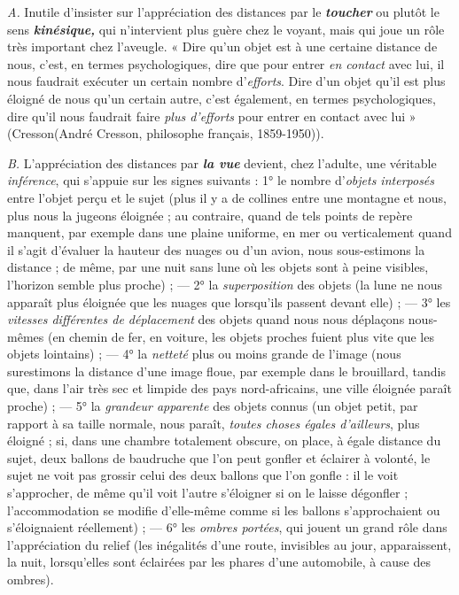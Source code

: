 {\it A.} Inutile d’insister sur l'appréciation des distances par le \textbf{\textit {toucher}}
ou plutôt le sens \textbf{\textit {kinésique,}} qui n’intervient plus guère chez le voyant,
mais qui joue un rôle très important chez l’aveugle. « Dire qu’un
objet est à une certaine distance de nous, c’est, en termes psychologiques,
dire que pour entrer {\it en contact} avec lui, il nous faudrait exécuter
un certain nombre d’{\it efforts}. Dire d’un objet qu’il est plus éloigné
de nous qu’un certain autre, c’est également, en termes psychologiques,
dire qu’il nous faudrait faire {\it plus d’efforts} pour entrer en
contact avec lui » (Cresson{\scriptsize (André Cresson, philosophe français, 1859-1950)}).

{\it B.} L’appréciation des distances par \textbf{\textit {la vue}} devient, chez l’adulte,
une véritable {\it inférence}, qui s’appuie sur les signes suivants : 1° le
nombre d’{\it objets interposés} entre l’objet perçu et le sujet (plus il y a
de collines entre une montagne et nous, plus nous la jugeons éloignée ;
au contraire, quand de tels points de repère manquent, par exemple
dans une plaine uniforme, en mer ou verticalement quand il s’agit
d'évaluer la hauteur des nuages ou d’un avion, nous sous-estimons la
distance ; de même, par une nuit sans lune où les objets sont à peine
visibles, l'horizon semble plus proche) ; — 2° la {\it superposition} des
objets (la lune ne nous apparaît plus éloignée que les nuages que
lorsqu'ils passent devant elle) ; — 3° les {\it vitesses différentes de déplacement}
des objets quand nous nous déplaçons nous-mêmes (en chemin
de fer, en voiture, les objets proches fuient plus vite que les objets
lointains) ; — 4° la {\it netteté} plus ou moins grande de l’image (nous
surestimons la distance d’une image floue, par exemple dans le brouillard,
tandis que, dans l’air très sec et limpide des pays nord-africains,
une ville éloignée paraît proche) ; — 5° la {\it grandeur apparente} des
objets connus (un objet petit, par rapport à sa taille normale, nous
paraît, {\it toutes choses égales d’ailleurs}, plus éloigné ; si, dans une chambre
totalement obscure, on place, à égale distance du sujet, deux ballons
de baudruche que l’on peut gonfler et éclairer à volonté, le sujet ne
voit pas grossir celui des deux ballons que l’on gonfle : il le voit
s'approcher, de même qu'il voit l’autre s’éloigner si on le laisse dégonfler ;
l'accommodation se modifie d’elle-même comme si les ballons
s’approchaient ou s’éloignaient réellement) ; — 6° les {\it ombres portées},
qui jouent un grand rôle dans l’appréciation du relief (les inégalités
d’une route, invisibles au jour, apparaissent, la nuit, lorsqu'elles sont
éclairées par les phares d’une automobile, à cause des ombres).

